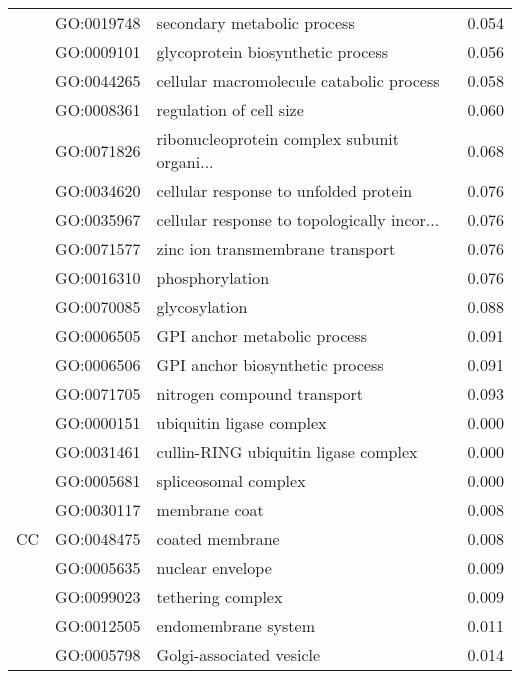 \begin{longtable}{lllr}
   & GO:0019748 &                  secondary metabolic process &         0.054 \\
   & GO:0009101 &            glycoprotein biosynthetic process &         0.056 \\
   & GO:0044265 &     cellular macromolecule catabolic process &         0.058 \\
   & GO:0008361 &                      regulation of cell size &         0.060 \\
   & GO:0071826 &  ribonucleoprotein complex subunit organi... &         0.068 \\
   & GO:0034620 &        cellular response to unfolded protein &         0.076 \\
   & GO:0035967 &  cellular response to topologically incor... &         0.076 \\
   & GO:0071577 &             zinc ion transmembrane transport &         0.076 \\
   & GO:0016310 &                              phosphorylation &         0.076 \\
   & GO:0070085 &                                glycosylation &         0.088 \\
   & GO:0006505 &                 GPI anchor metabolic process &         0.091 \\
   & GO:0006506 &              GPI anchor biosynthetic process &         0.091 \\
   & GO:0071705 &                  nitrogen compound transport &         0.093 \\
\cline{1-4}
\multirow{21}{*}{CC} & GO:0000151 &                     ubiquitin ligase complex &         0.000 \\
   & GO:0031461 &         cullin-RING ubiquitin ligase complex &         0.000 \\
   & GO:0005681 &                         spliceosomal complex &         0.000 \\
   & GO:0030117 &                                membrane coat &         0.008 \\
   & GO:0048475 &                              coated membrane &         0.008 \\
   & GO:0005635 &                             nuclear envelope &         0.009 \\
   & GO:0099023 &                            tethering complex &         0.009 \\
   & GO:0012505 &                          endomembrane system &         0.011 \\
   & GO:0005798 &                     Golgi-associated vesicle &         0.014 \\

\end{longtable}
